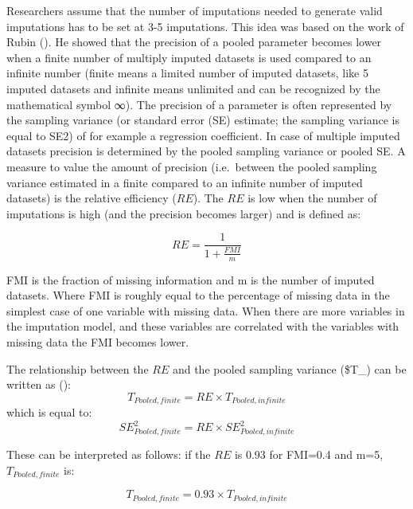 \documentclass[
]{book}
\begin{document}
Researchers assume that the number of imputations needed to generate valid imputations has to be set at 3-5 imputations. This idea was based on the work of Rubin (\citet{Rubin1987}). He showed that the precision of a pooled parameter becomes lower when a finite number of multiply imputed datasets is used compared to an infinite number (finite means a limited number of imputed datasets, like 5 imputed datasets and infinite means unlimited and can be recognized by the mathematical symbol ∞). The precision of a parameter is often represented by the sampling variance (or standard error (SE) estimate; the sampling variance is equal to SE2) of for example a regression coefficient. In case of multiple imputed datasets precision is determined by the pooled sampling variance or pooled SE. A measure to value the amount of precision (i.e.~between the pooled sampling variance estimated in a finite compared to an infinite number of imputed datasets) is the relative efficiency (\(RE\)). The \(RE\) is low when the number of imputations is high (and the precision becomes larger) and is defined as:

\[RE=  \frac{1}{1+ \frac{FMI}{m}}\]

FMI is the fraction of missing information and m is the number of imputed datasets. Where FMI is roughly equal to the percentage of missing data in the simplest case of one variable with missing data. When there are more variables in the imputation model, and these variables are correlated with the variables with missing data the FMI becomes lower.

The relationship between the \(RE\) and the pooled sampling variance (\$T\_) can be written as (\citet{VanBuuren2018}):
\[T_{Pooled,finite}=RE×T_{Pooled,infinite}\]
which is equal to:
\[SE_{Pooled,finite}^2=RE×SE_{Pooled,infinite}^2 \]

These can be interpreted as follows: if the \(RE\) is 0.93 for FMI=0.4 and m=5, \(T_{Pooled,finite}\) is:

\[T_{Pooled,finite}=0.93×T_{Pooled,infinite}\]
\end{document}
